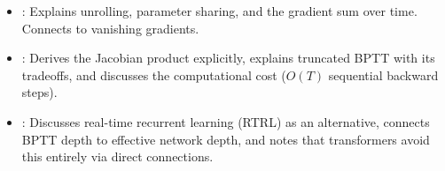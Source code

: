 \begin{interviewq}
\goodgreat
\begin{itemize}
\item {}: Explains unrolling, parameter sharing, and the
  gradient sum over time.  Connects to vanishing gradients.
\item {}: Derives the Jacobian product explicitly, explains
  truncated BPTT with its tradeoffs, and discusses the computational
  cost ($O(T)$ sequential backward steps).
\item {}: Discusses real-time recurrent learning (RTRL) as
  an alternative, connects BPTT depth to effective network depth, and
  notes that transformers avoid this entirely via direct connections.
\end{itemize}

\end{interviewq}

